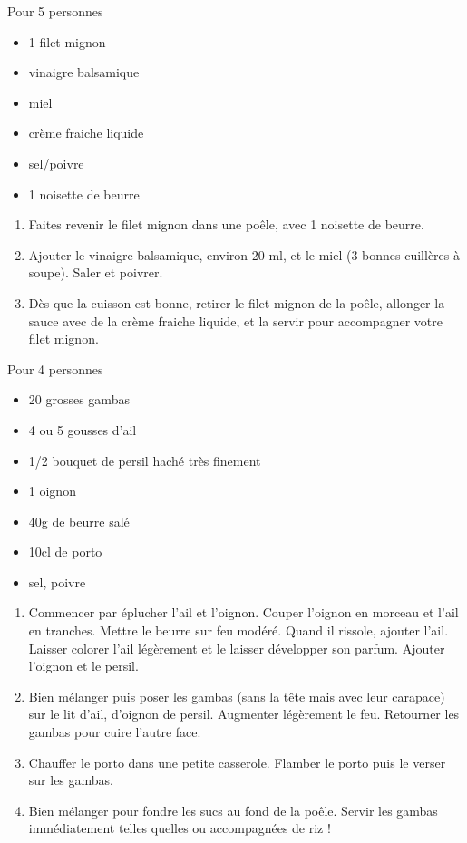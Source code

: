 \bigskip
{}
{Pour 5 personnes}{\begin{itemize}
	\item 1 filet mignon
	\item vinaigre balsamique
	\item miel
	\item crème fraiche liquide
	\item sel/poivre
	\item 1 noisette de beurre
\end{itemize}}
{\phantom{.}

\bigskip
\begin{enumerate}
	\item Faites revenir le filet mignon dans une poêle, avec 1 noisette de beurre.
	\item Ajouter le vinaigre balsamique, environ 20 ml, et le miel (3 bonnes cuillères à soupe). Saler et poivrer.
	\item Dès que la cuisson est bonne, retirer le filet mignon de la poêle, allonger la sauce avec de la crème fraiche liquide, et la servir pour accompagner votre filet mignon.
\end{enumerate}

\bigskip
\phantom{.}}

\bigskip
{}
{Pour 4 personnes}{\begin{itemize}
	\item 20 grosses gambas
	\item 4 ou 5 gousses d'ail
	\item 1/2 bouquet de persil haché très finement
	\item 1 oignon
	\item 40g de beurre salé
	\item 10cl de porto
	\item sel, poivre
\end{itemize}}
{\begin{enumerate}
	\item Commencer par éplucher l'ail et l'oignon. Couper l'oignon en morceau et l'ail en tranches. Mettre le beurre sur feu modéré. Quand il rissole, ajouter l'ail. Laisser colorer l'ail légèrement et le laisser développer son parfum. Ajouter l'oignon et le persil.
	\item Bien mélanger puis poser les gambas (sans la tête mais avec leur carapace) sur le lit d'ail, d'oignon de persil. Augmenter légèrement le feu. Retourner les gambas pour cuire l'autre face.
	\item Chauffer le porto dans une petite casserole. Flamber le porto puis le verser sur les gambas. 
	\item Bien mélanger pour fondre les sucs au fond de la poêle. Servir les gambas immédiatement telles quelles ou accompagnées de riz !
\end{enumerate}}

